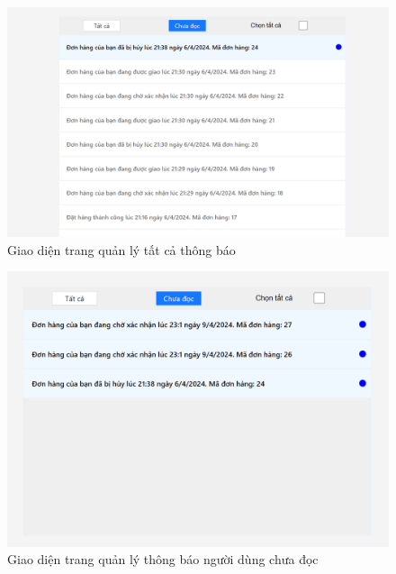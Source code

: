 \begin{figure}[H]
    \begin{center}
    \includegraphics[scale=0.5]{images/hieu/chap-5/noti.png}
    \vspace*{3mm}
    \caption{Giao diện trang quản lý tất cả thông báo}
    \end{center}
\end{figure}
\begin{figure}[H]
    \begin{center}
    \includegraphics[scale=0.5]{images/hieu/chap-5/noti-notread.png}
    \vspace*{3mm}
    \caption{Giao diện trang quản lý thông báo người dùng chưa đọc }
    \end{center}
\end{figure}
